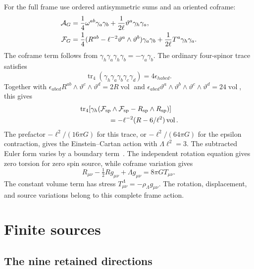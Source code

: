 \documentclass[aps,prx,reprint,longbibliography]{revtex4-2}
\providecommand{\tr}{\operatorname{tr}}
\begin{document}
For the full frame use ordered antisymmetric sums and an oriented coframe:
\begin{align}
 \mathcal A_G={}&\frac14\omega^{ab}\gamma_a\gamma_b
 +\frac1{2\ell}\vartheta^a\gamma_h\gamma_a,\notag\\
 \mathcal F_G={}&\frac14(R^{ab}-\ell^{-2}\vartheta^a\wedge \vartheta^b)\gamma_a\gamma_b
 +\frac1{2\ell}T^a\gamma_h\gamma_a.
 \label{ap:frameconnection}
\end{align}
The coframe term follows from $\gamma_h\gamma_a\gamma_h\gamma_b=-\gamma_a\gamma_b$. The ordinary four-spinor trace satisfies
\begin{equation}
 \tr_4(\gamma_h\gamma_a\gamma_b\gamma_c\gamma_d)=4\epsilon_{habcd}.
 \label{ap:spintrace}
\end{equation}
Together with $\epsilon_{abcd}R^{ab}\wedge \vartheta^c\wedge \vartheta^d=2R\operatorname{vol}$ and $\epsilon_{abcd}\vartheta^a\wedge \vartheta^b\wedge \vartheta^c\wedge \vartheta^d=24\operatorname{vol}$, this gives
\begin{equation}
 \begin{aligned}
 &\tr_4\!\left[\gamma_h(\mathcal F_{\rm sp}\wedge\mathcal F_{\rm sp}
 -R_{\rm sp}\wedge R_{\rm sp})\right]\\
 &\hspace{1.5cm}=-\ell^{-2}(R-6/\ell^2)\operatorname{vol}.
 \end{aligned}
 \label{ap:frametrace}
\end{equation}
The prefactor $-\ell^2/(16\pi G)$ for this trace, or $-\ell^2/(64\pi G)$ for the epsilon contraction, gives the Einstein--Cartan action with $\Lambda\ell^2=3$. The subtracted Euler form varies by a boundary term~\cite{MacDowellMansouri}. The independent rotation equation gives zero torsion for zero spin source, while coframe variation gives
\begin{equation}
 R_{\mu\nu}-\tfrac12Rg_{\mu\nu}+\Lambda g_{\mu\nu}
 =8\pi G T_{\mu\nu}.
 \label{ap:einstein}
\end{equation}
The constant volume term has stress $T^\Lambda_{\mu\nu}=-\rho_\Lambda g_{\mu\nu}$. The rotation, displacement, and source variations belong to this complete frame action.

\section{Finite sources}
\label{app:finite-sources}

\subsection{The nine retained directions}
\label{app:nine}
\end{document}
